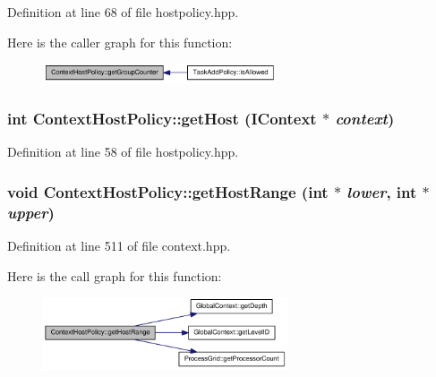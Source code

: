 Definition at line 68 of file hostpolicy.hpp.

Here is the caller graph for this function:\nopagebreak
\begin{figure}[H]
\begin{center}
\leavevmode
\includegraphics[width=196pt]{class_context_host_policy_a4281d32782181a79b2000f28fbb1b771_icgraph}
\end{center}
\end{figure}
\hypertarget{class_context_host_policy_a463cff37397e882a9e7d164c7d33527e}{
\subsubsection[{getHost}]{\setlength{\rightskip}{0pt plus 5cm}int ContextHostPolicy::getHost ({\bf IContext} $\ast$ {\em context})}}
\label{class_context_host_policy_a463cff37397e882a9e7d164c7d33527e}


Definition at line 58 of file hostpolicy.hpp.\hypertarget{class_context_host_policy_aff4f859ac0102e7ad268f17aff1b0259}{
\subsubsection[{getHostRange}]{\setlength{\rightskip}{0pt plus 5cm}void ContextHostPolicy::getHostRange (int $\ast$ {\em lower}, \/  int $\ast$ {\em upper})}}
\label{class_context_host_policy_aff4f859ac0102e7ad268f17aff1b0259}


Definition at line 511 of file context.hpp.

Here is the call graph for this function:\nopagebreak
\begin{figure}[H]
\begin{center}
\leavevmode
\includegraphics[width=205pt]{class_context_host_policy_aff4f859ac0102e7ad268f17aff1b0259_cgraph}
\end{center}
\end{figure}



